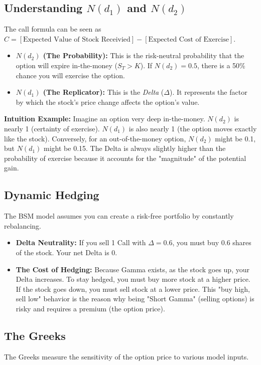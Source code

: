 \subsection{Understanding $N(d_1)$ and $N(d_2)$}
The call formula can be seen as $C = [\text{Expected Value of Stock Receivied}] - [\text{Expected Cost of Exercise}]$.
\begin{itemize}
    \item \textbf{$N(d_2)$ (The Probability):} This is the risk-neutral probability that the option will expire in-the-money ($S_T > K$). If $N(d_2) = 0.5$, there is a 50\% chance you will exercise the option.
    \item \textbf{$N(d_1)$ (The Replicator):} This is the \textit{Delta} ($\Delta$). It represents the factor by which the stock's price change affects the option's value. 
\end{itemize}
\textbf{Intuition Example:} Imagine an option very deep in-the-money. $N(d_2)$ is nearly 1 (certainty of exercise). $N(d_1)$ is also nearly 1 (the option moves exactly like the stock). Conversely, for an out-of-the-money option, $N(d_2)$ might be 0.1, but $N(d_1)$ might be 0.15. The Delta is always slightly higher than the probability of exercise because it accounts for the "magnitude" of the potential gain.

\subsection{Dynamic Hedging}
The BSM model assumes you can create a risk-free portfolio by constantly rebalancing.
\begin{itemize}
    \item \textbf{Delta Neutrality:} If you sell 1 Call with $\Delta=0.6$, you must buy 0.6 shares of the stock. Your net Delta is $0$.
    \item \textbf{The Cost of Hedging:} Because Gamma exists, as the stock goes up, your Delta increases. To stay hedged, you must buy more stock at a higher price. If the stock goes down, you must sell stock at a lower price. This "buy high, sell low" behavior is the reason why being "Short Gamma" (selling options) is risky and requires a premium (the option price).
\end{itemize}

\subsection{The Greeks}
The Greeks measure the sensitivity of the option price to various model inputs.

